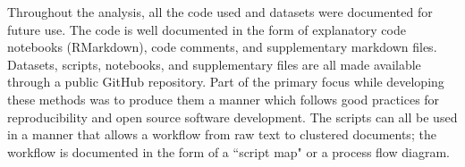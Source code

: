 Throughout the analysis, all the code used and datasets were documented for future use. The code is well documented in the form of explanatory code notebooks (RMarkdown), code comments, and supplementary markdown files. Datasets, scripts, notebooks, and supplementary files are all made available through a public GitHub repository. Part of the primary focus while developing these methods was to produce them a manner which follows good practices for reproducibility and open source software development. The scripts can all be used in a manner that allows a workflow from raw text to clustered documents; the workflow is documented in the form of a ``script map" or a process flow diagram. 